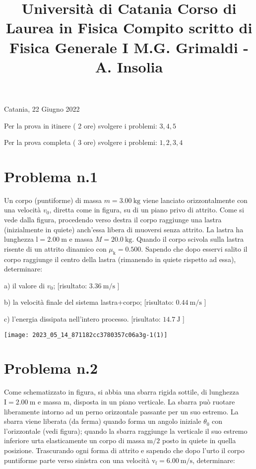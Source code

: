 \documentclass[10pt]{article}
\title{Università di Catania 
 Corso di Laurea in Fisica 
 Compito scritto di Fisica Generale I 
 M.G. Grimaldi - A. Insolia }
\author{}
\date{}
\begin{document}
\maketitle
Catania, 22 Giugno 2022

Per la prova in itinere ( 2 ore) svolgere i problemi: \(3,4,5\)

Per la prova completa ( 3 ore) svolgere i problemi: \(1,2,3,4\)

\section{Problema n.1}
Un corpo (puntiforme) di massa \(m=3.00 \mathrm{~kg}\) viene lanciato orizzontalmente con una velocità \(v_{0}\), diretta come in figura, su di un piano privo di attrito. Come si vede dalla figura, procedendo verso destra il corpo raggiunge una lastra (inizialmente in quiete) anch'essa libera di muoversi senza attrito. La lastra ha lunghezza \(\mathrm{l}=2.00 \mathrm{~m}\) e massa \(M=20.0 \mathrm{~kg}\). Quando il corpo scivola sulla lastra risente di un attrito dinamico con \(\mu_{\mathrm{k}}=0.500\). Sapendo che dopo esservi salito il corpo raggiunge il centro della lastra (rimanendo in quiete rispetto ad essa), determinare:

a) il valore di \(v_{0}\); [risultato: \(3.36 \mathrm{~m} / \mathrm{s}\) ]

b) la velocità finale del sistema lastra+corpo; [risultato: \(0.44 \mathrm{~m} / \mathrm{s}\) ]

c) l'energia dissipata nell'intero processo. [risultato: \(14.7 \mathrm{~J}\) ]

\begin{center}
\texttt{[image: 2023\_05\_14\_871182cc3780357c06a3g-1(1)]}
\end{center}

\section{Problema n.2}
Come schematizzato in figura, si abbia una sbarra rigida sottile, di lunghezza \(\mathrm{I}=2.00 \mathrm{~m}\) e massa \(\mathrm{m}\), disposta in un piano verticale. La sbarra può ruotare liberamente intorno ad un perno orizzontale passante per un suo estremo. La sbarra viene liberata (da ferma) quando forma un angolo iniziale \(\theta_{0}\) con l'orizzontale (vedi figura); quando la sbarra raggiunge la verticale il suo estremo inferiore urta elasticamente un corpo di massa \(\mathrm{m} / 2\) posto in quiete in quella posizione. Trascurando ogni forma di attrito e sapendo che dopo l'urto il corpo puntiforme parte verso sinistra con una velocità \(\mathrm{v}_{\mathrm{f}}=6.00 \mathrm{~m} / \mathrm{s}\), determinare:
\end{document}
